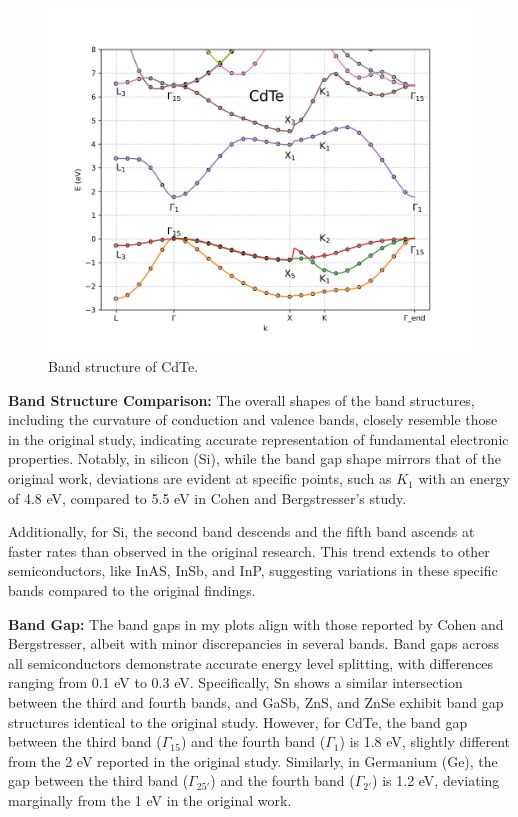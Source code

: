 \documentclass[twocolumn]{article}[h]
\begin{document}
\begin{figure}[htb]
    \centering
    \includegraphics[width=\linewidth]{CdTe.png}
    \vspace{-1cm}
    \caption{Band structure of CdTe.}
    \label{fig:CdTe}
\end{figure}
\clearpage
\textbf{Band Structure Comparison:} The overall shapes of the band structures, including the curvature of conduction and valence bands, closely resemble those in the original study, indicating accurate representation of fundamental electronic properties. Notably, in silicon (Si), while the band gap shape mirrors that of the original work, deviations are evident at specific points, such as \( K_1 \) with an energy of 4.8 eV, compared to 5.5 eV in Cohen and Bergstresser's study.

Additionally, for Si, the second band descends and the fifth band ascends at faster rates than observed in the original research. This trend extends to other semiconductors, like InAS, InSb, and InP, suggesting variations in these specific bands compared to the original findings.

\textbf{Band Gap:} The band gaps in my plots align with those reported by Cohen and Bergstresser, albeit with minor discrepancies in several bands. Band gaps across all semiconductors demonstrate accurate energy level splitting, with differences ranging from 0.1 eV to 0.3 eV. Specifically, Sn shows a similar intersection between the third and fourth bands, and GaSb, ZnS, and ZnSe exhibit band gap structures identical to the original study. However, for CdTe, the band gap between the third band ($\Gamma_{15}$) and the fourth band ($\Gamma_1$) is 1.8 eV, slightly different from the 2 eV reported in the original study. Similarly, in Germanium (Ge), the gap between the third band ($\Gamma_{25'}$) and the fourth band ($\Gamma_{2'}$) is 1.2 eV, deviating marginally from the 1 eV in the original work.
\end{document}
